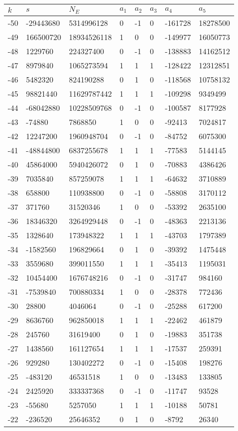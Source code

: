 \documentclass{amsart}
\begin{document}
\begin{longtable}{|l|l|l|lllll|}
\hline
$k$ & $s$ & $N_E$ & $a_1$ & $a_2$ & $a_3$ & $a_4$ & $a_5$\\
\hline
-50&-29443680&5314996128&0&-1&0&-161728&18278500\\
-49&166500720&18934526118&1&0&0&-149977&16050773\\
-48&1229760&224327400&0&-1&0&-138883&14162512\\
-47&8979840&1065273594&1&1&1&-128422&12312851\\
-46&5482320&824190288&0&1&0&-118568&10758132\\
-45&98821440&11629787442&1&1&1&-109298&9349499\\
-44&-68042880&10228509768&0&-1&0&-100587&8177928\\
-43&-74880&7868850&1&0&0&-92413&7024817\\
-42&12247200&1960948704&0&-1&0&-84752&6075300\\
-41&-48844800&6837255678&1&1&1&-77583&5144145\\
-40&45864000&5940426072&0&1&0&-70883&4386426\\
-39&7035840&857259078&1&1&1&-64632&3710889\\
-38&658800&110938800&0&-1&0&-58808&3170112\\
-37&371760&31520346&1&0&0&-53392&2635100\\
-36&18346320&3264929448&0&-1&0&-48363&2213136\\
-35&1328640&173948322&1&1&1&-43703&1797389\\
-34&-1582560&196829664&0&1&0&-39392&1475448\\
-33&3559680&399011550&1&1&1&-35413&1195031\\
-32&10454400&1676748216&0&-1&0&-31747&984160\\
-31&-7539840&700880334&1&0&0&-28378&772436\\
-30&28800&4046064&0&-1&0&-25288&617200\\
-29&8636760&962850018&1&1&1&-22462&461879\\
-28&245760&31619400&0&1&0&-19883&351738\\
-27&1438560&161127654&1&1&1&-17537&259391\\
-26&929280&130402272&0&-1&0&-15408&198276\\
-25&-483120&46531518&1&0&0&-13483&133805\\
-24&2425920&333337368&0&-1&0&-11747&93528\\
-23&-55680&5257050&1&1&1&-10188&50781\\
-22&-236520&25646352&0&1&0&-8792&26340\\

\end{longtable}
\end{document}
